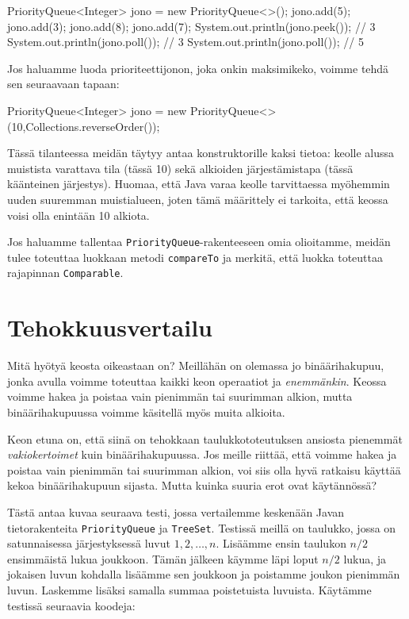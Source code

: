 \begin{code}
PriorityQueue<Integer> jono = new PriorityQueue<>();
jono.add(5);
jono.add(3);
jono.add(8);
jono.add(7);
System.out.println(jono.peek()); // 3
System.out.println(jono.poll()); // 3
System.out.println(jono.poll()); // 5
\end{code}

Jos haluamme luoda prioriteettijonon, joka onkin
maksimikeko, voimme tehdä sen seuraavaan tapaan:

\begin{code}
PriorityQueue<Integer> jono =
    new PriorityQueue<>(10,Collections.reverseOrder());
\end{code}

Tässä tilanteessa meidän täytyy antaa konstruktorille kaksi tietoa:
keolle alussa muistista varattava tila (tässä 10)
sekä alkioiden järjestämistapa (tässä käänteinen järjestys).
Huomaa, että Java varaa keolle tarvittaessa myöhemmin uuden suuremman muistialueen,
joten tämä määrittely ei tarkoita, että keossa voisi olla enintään 10 alkiota.

Jos haluamme tallentaa \texttt{PriorityQueue}-rakenteeseen omia olioitamme,
meidän tulee toteuttaa luokkaan metodi \texttt{compareTo} ja
merkitä, että luokka toteuttaa rajapinnan \texttt{Comparable}.

\section{Tehokkuusvertailu}

Mitä hyötyä keosta oikeastaan on?
Meillähän on olemassa jo binäärihakupuu,
jonka avulla voimme toteuttaa kaikki keon operaatiot
ja \emph{enemmänkin}.
Keossa voimme hakea ja poistaa vain pienimmän tai suurimman alkion,
mutta binäärihakupuussa voimme käsitellä myös muita alkioita.

Keon etuna on, että siinä on tehokkaan taulukkototeutuksen
ansiosta pienemmät \emph{vakiokertoimet} kuin binäärihakupuussa.
Jos meille riittää, että voimme hakea ja poistaa
vain pienimmän tai suurimman alkion, voi siis olla hyvä
ratkaisu käyttää kekoa binäärihakupuun sijasta.
Mutta kuinka suuria erot ovat käytännössä?

Tästä antaa kuvaa seuraava testi,
jossa vertailemme keskenään Javan tietorakenteita
\texttt{PriorityQueue} ja \texttt{TreeSet}.
Testissä meillä on taulukko,
jossa on satunnaisessa järjestyksessä luvut $1,2,\dots,n$.
Lisäämme ensin taulukon $n/2$ ensimmäistä lukua joukkoon.
Tämän jälkeen käymme läpi loput $n/2$ lukua,
ja jokaisen luvun kohdalla lisäämme sen joukkoon ja
poistamme joukon pienimmän luvun.
Laskemme lisäksi samalla summaa poistetuista luvuista.
Käytämme testissä seuraavia koodeja:

